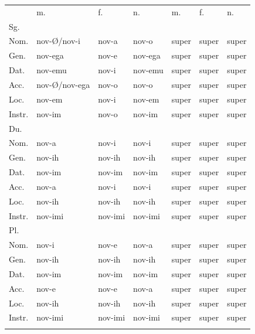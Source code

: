 \documentclass[output=paper]{langscibook}
\begin{document}
\begin{tabularx}{\textwidth}{XXXXXXX}
 & m. & f. & n. & m. & f. & n.\\
\lsptoprule
Sg. & ~ & ~ & ~ & ~ & ~ & ~\\
Nom. & nov-Ø/nov-i\footnotemark{} & nov-a & nov-o & super & super & super\\
Gen. & nov-ega & nov-e & nov-ega & super & super & super\\
Dat. & nov-emu & nov-i & nov-emu & super & super & super\\
Acc. & nov-Ø/nov-ega\footnotemark{} & nov-o & nov-o & super & super & super\\
Loc. & nov-em & nov-i & nov-em & super & super & super\\
Instr. & nov-im & nov-o & nov-im & super & super & super\\
Du. & ~ & ~ & ~ & ~ & ~ & ~\\
Nom. & nov-a & nov-i & nov-i & super & super & super\\
Gen. & nov-ih & nov-ih & nov-ih & super & super & super\\
Dat. & nov-im & nov-im & nov-im & super & super & super\\
Acc. & nov-a & nov-i & nov-i & super & super & super\\
Loc. & nov-ih & nov-ih & nov-ih & super & super & super\\
Instr. & nov-imi & nov-imi & nov-imi & super & super & super\\
Pl. &  &  &  &  &  & \\
Nom. & nov-i & nov-e & nov-a & super & super & super\\
Gen. & nov-ih & nov-ih & nov-ih & super & super & super\\
Dat. & nov-im & nov-im & nov-im & super & super & super\\
Acc. & nov-e & nov-e & nov-a & super & super & super\\
Loc. & nov-ih & nov-ih & nov-ih & super & super & super\\
Instr. & nov-imi & nov-imi & nov-imi & super & super & super\\
\lspbottomrule
\end{tabularx}
\addtocounter{footnote}{-2}
\begin{table}
\caption{inflectable and uninflectable adjective in Slovene}
\label{tab:key:4}
\end{table}
\end{document}
